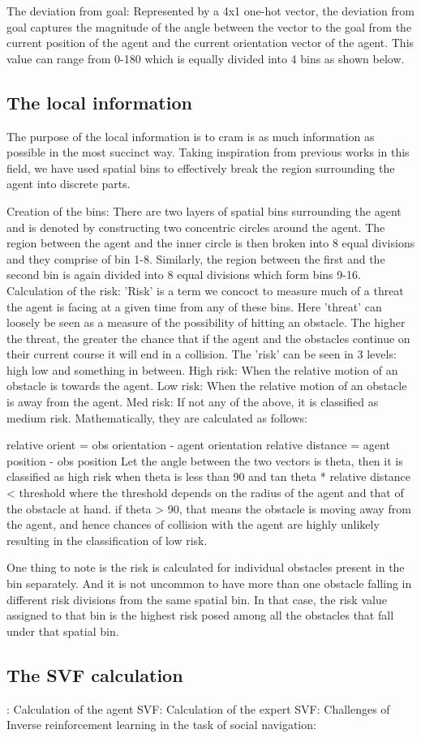 The deviation from goal: Represented by a 4x1 one-hot vector, the deviation from goal captures the magnitude of the angle between the vector to the goal from the current position of the agent and the current orientation vector of the agent. This value can range from 0-180 which is equally divided into 4 bins as shown below.

\subsection*{The local information}
The purpose of the local information is to cram is as much information as possible in the most succinct way. Taking inspiration from previous works in this field, we have used spatial bins to effectively break the region surrounding the agent into discrete parts.

Creation of the bins:
There are two layers of spatial bins surrounding the agent and is denoted by constructing two concentric circles around the agent. The region between the agent and the inner circle is then broken into 8 equal divisions and they comprise of bin 1-8. Similarly, the region between the first and the second bin is again divided into 8 equal divisions which form bins 9-16.
Calculation of the risk:
'Risk' is a term we concoct to measure much of a  threat the agent is facing at a given time from any of these bins. Here 'threat' can loosely be seen as a measure of the possibility of hitting an obstacle. The higher the threat, the greater the chance that if the agent and the obstacles continue on their current course it will end in a collision.
The 'risk' can be seen in 3 levels:
high low and something in between.
High risk:
When the relative motion of an obstacle is towards the agent.
Low risk:
When the relative motion of an obstacle is away from the agent.
Med risk:
If not any of the above, it is classified as medium risk.
Mathematically, they are calculated as follows:

relative orient = obs orientation - agent orientation
relative distance = agent position - obs position
Let the angle between the two vectors is theta, then it is classified as high risk when
theta is less than 90 and tan theta * relative distance < threshold
where the threshold depends on the radius of the agent and that of the obstacle at hand.
if theta > 90, that means the obstacle is moving away from the agent, and hence chances of collision with the agent are highly unlikely resulting in the classification of low risk.

One thing to note is the risk is calculated for individual obstacles present in the bin separately. And it is not uncommon to have more than one obstacle falling in different risk divisions from the same spatial bin. In that case, the risk value assigned to that bin is the highest risk posed among all the obstacles that fall under that spatial bin.

\subsection*{The SVF calculation}:
Calculation of the agent SVF:
Calculation of the expert SVF:
Challenges of Inverse reinforcement learning in the task of social navigation:



